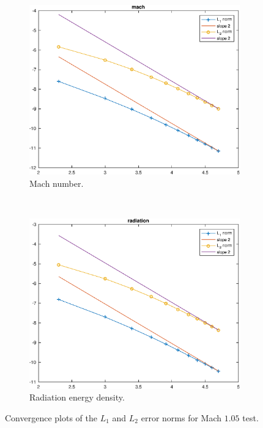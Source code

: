 \documentclass[times,doublespace]{fldauth}%
\begin{document}
\begin{figure}[H]
    \begin{subfigure}{0.5\textwidth}
    \centering
    \includegraphics[width=\linewidth]{figures/cst-xs/mach_1p05_mach_spline.eps}
    \caption{Mach number.}\label{fig:mach-1p05-cst-xs-mach}
    \end{subfigure}
    ~
    \begin{subfigure}{0.5\textwidth}
    \centering
    \includegraphics[width=\linewidth]{figures/cst-xs/mach_1p05_radiation_spline.eps}
    \caption{Radiation energy density.}\label{fig:mach-1p05-cst-xs-radiation}
    \end{subfigure}        
\caption{Convergence plots of the $L_1$ and $L_2$ error norms for Mach $1.05$ test.}\label{fig:mach-1p05-cst-xs}    
\end{figure}
\end{document}

